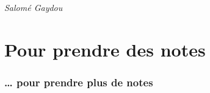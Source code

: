 \documentclass[
  10pt,
  french,
  a5paper,
  openany]{book}
\newenvironment{signature}{\begin{flushright}}{\end{flushright}}
\begin{document}
\begin{signature}
\emph{Salomé Gaydou}

\end{signature}

\hypertarget{pour-prendre-des-notes}{%
\chapter*{Pour prendre des notes}\label{pour-prendre-des-notes}}

\clearpage

\hypertarget{pour-prendre-plus-de-notes}{%
\subsection*{\ldots{} pour prendre plus de notes}\label{pour-prendre-plus-de-notes}}
\end{document}
